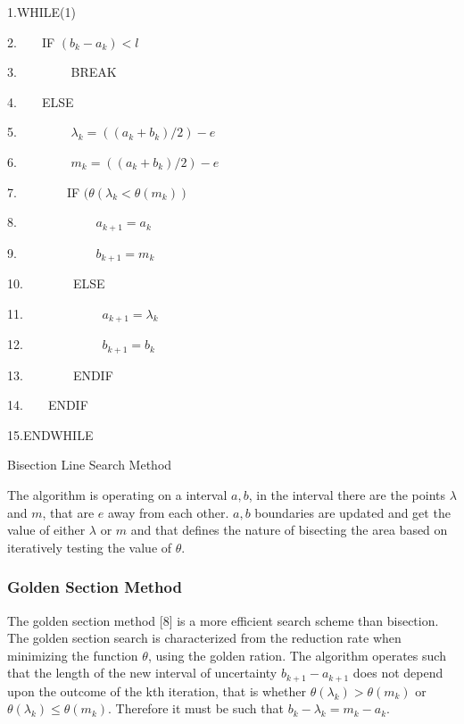 \documentclass[times,12pt]{ACME2015article}
\newenvironment{lyxcode}
{\par\begin{list}{}{
\setlength{\rightmargin}{\leftmargin}
\setlength{\listparindent}{0pt}%
\raggedright
\setlength{\itemsep}{0pt}
\setlength{\parsep}{0pt}
\normalfont\ttfamily}%
 \item[]}
{\end{list}}
\begin{document}
\begin{algorithm}
\begin{lyxcode}
1.WHILE(1)

2.~~~~IF $(b_{k} - a_{k}) < l$

3.~~~~~~~~	BREAK

4.~~~~ELSE

5.~~~~	~~~~$\lambda_{k} = ((a_{k}+b_{k})/2) - e$

6.~~~~	~~~~$m_{k} = ((a_{k}+b_{k})/2) - e$		

7.~~~~~~~~IF $(\theta(\lambda_{k} < \theta(m_{k}))$

8.~~~~~~~~~~~~	$a_{k+1} = a_{k}$

9.~~~~~~~~~~~~	$b_{k+1} = m_{k}$
	
10.~~~~~~~~ELSE

11.~~~~~~~~	~~~~$a_{k+1} = \lambda_{k}$
	
12.~~~~~~~~~~~~	$b_{k+1} = b_{k}$

13.~~~~~~~~ENDIF

14.~~~~ENDIF

15.ENDWHILE

\end{lyxcode}
\protect\caption{\label{alg6}Bisection Line Search Method}
\end{algorithm}

The algorithm is operating on a interval $a, b$, in the interval there are the points $\lambda $ and $m$, that are $e$ away from each other. 
$a, b$ boundaries are updated and get the value of either $\lambda$ or $m$ and that defines the nature of bisecting the area based on iteratively testing the value of $\theta$. 


\subsubsection{Golden Section Method}
The golden section method [8] is a more efficient search scheme than bisection. The golden section search is characterized from the reduction rate when minimizing the function $\theta$, using the golden ration. The algorithm operates such that the length of the new interval of uncertainty $b_{k+1} - a_{k+1}$ does not depend upon the outcome of the kth iteration, that is whether $\theta (\lambda_{k}) > \theta (m_{k})$ or $\theta (\lambda_{k}) \leq \theta (m_{k})$. Therefore it must be such that $b_{k}-\lambda_{k} = m_{k} - a_{k}$. 
\end{document}
